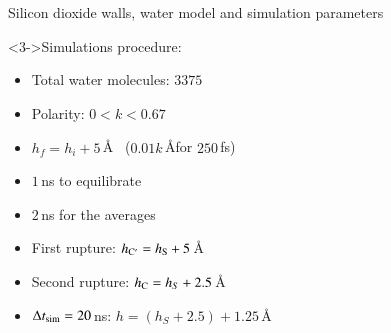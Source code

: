 \documentclass[8pt]{beamer}
\begin{document}
\begin{frame}
\begin{block}{Silicon dioxide walls, water model and simulation parameters}
\begin{minipage}{0.41\textwidth}
					\begin{minipage}{0.58\textwidth}
					\end{minipage}
      		   \end{minipage}			 
	    \vspace{-0.1cm}	   
		\end{block}
		\vspace{-0.1cm}
  	   \begin{minipage}{0.46\textwidth}
  	   	    \vspace{-0.2cm}	   
  	   		\begin{block}{Simulations procedure:}
				\begin{itemize}
					\item<3-> \small Total water molecules: $3375$
					\item<3-> \small Polarity: $0<k<0.67$
  				\end{itemize}	
			    \vspace{-0.1cm}	   
				\begin{itemize}	
					\item<4-> \small $h_f=h_i+5$\,\AA~ ($0.01\hat{k}$\,\AA for $250$\,fs)
					\item<4-> \small $1$\,ns to equilibrate  					
					\item<4-> \small $2$\,ns for the averages					
  				\end{itemize}										
				\begin{itemize}	
					\item<5-> \small First rupture: $h_{\rm C{}'} = h_{\rm S} + 5$\,\AA
          			\item<5-> \small Second rupture: $h_{\rm C}= h_S + 2.5$\,\AA
                    \item<5-> \small $\Delta t_{\rm sim}=20$\,ns:  $h = (h_{S} +2.5) + 1.25$\,\AA
  				\end{itemize}	  	   		      

\end{block}
\end{minipage}
\end{frame}
\end{document}
